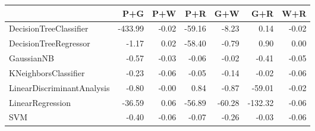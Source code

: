 \begin{tabular}{lrrrrrr}
\toprule
{} &     P+G &   P+W &    P+R &    G+W &     G+R &   W+R \\
\midrule
DecisionTreeClassifier     & -433.99 & -0.02 & -59.16 &  -8.23 &    0.14 & -0.02 \\
DecisionTreeRegressor      &   -1.17 &  0.02 & -58.40 &  -0.79 &    0.90 &  0.00 \\
GaussianNB                 &   -0.57 & -0.03 &  -0.06 &  -0.02 &   -0.41 & -0.05 \\
KNeighborsClassifier       &   -0.23 & -0.06 &  -0.05 &  -0.14 &   -0.02 & -0.06 \\
LinearDiscriminantAnalysis &   -0.80 & -0.00 &   0.84 &  -0.87 &  -59.01 & -0.02 \\
LinearRegression           &  -36.59 &  0.06 & -56.89 & -60.28 & -132.32 & -0.06 \\
SVM                        &   -0.40 & -0.06 &  -0.07 &  -0.26 &   -0.03 & -0.06 \\
\bottomrule
\end{tabular}
